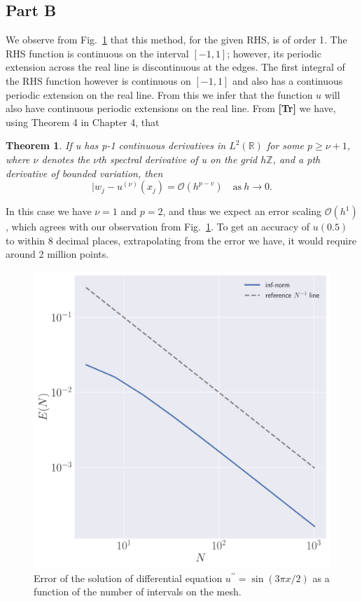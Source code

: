\documentclass[12pt]{article}
\newcommand{\bO}{\mathcal{O}}
\newtheorem{theorem}{Theorem}
\begin{document}
\subsection*{Part B}

We observe from Fig.~\ref{fig:q1b} that this method, for the given RHS, is of order 1. The RHS function is continuous on the interval $[-1,1]$; however, its periodic extension across the real line is discontinuous at the edges. The first integral of the RHS function however is continuous on $[-1,1]$ and also has a continuous periodic extension on the real line. From this we infer that the function $u$ will also have continuous periodic extensions on the real line. From \textbf{[Tr]} we have, using Theorem 4 in Chapter 4, that 

\begin{theorem}
	If u has p-1 continuous derivatives in $L^{2}(\mathbb{R})$ for some $p\ge \nu + 1$, where $\nu$ denotes the $\nu$th spectral derivative of u on the grid $h\mathbb{Z}$, and a pth derivative of bounded variation, then $$|w_{j}-u^{(\nu)}(x_{j}) = \bO(h^{p-v})\quad \mathrm{as}\ h\to 0.$$
\end{theorem}

In this case we have $\nu = 1$ and $p=2$, and thus we expect an error scaling $\bO(h^{1})$, which agrees with our observation from Fig.~\ref{fig:q1b}. To get an accuracy of $u(0.5)$ to within 8 decimal places, extrapolating from the error we have, it would require around 2 million points. 

\begin{figure}[!h]
    \centering
    \includegraphics[clip, scale=0.3]{q1b_fig.pdf}
    \caption{Error of the solution of differential equation $u^{\prime\prime} = \sin(3\pi x/2)$ as a function of the number of intervals on the mesh.}
    \label{fig:q1b}
\end{figure}
\end{document}
